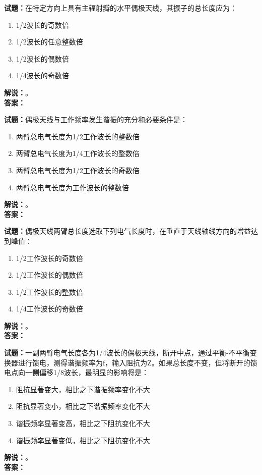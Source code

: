 \documentclass{ctexbook}
\begin{document}
\bigskip




\noindent\textbf{试题：}在特定方向上具有主辐射瓣的水平偶极天线，其振子的总长度应为：
\begin{enumerate}[leftmargin=3em]
\item 1/2波长的奇数倍
\item 1/2波长的任意整数倍
\item 1/2波长的偶数倍
\item 1/4波长的奇数倍
\end{enumerate}
\noindent\textbf{解说：}\textbf{}。\\\noindent\textbf{答案：}

\bigskip




\noindent\textbf{试题：}偶极天线与工作频率发生谐振的充分和必要条件是：
\begin{enumerate}[leftmargin=3em]
\item 两臂总电气长度为1/2工作波长的整数倍
\item 两臂总电气长度为1/4工作波长的整数倍
\item 两臂总电气长度为1/2工作波长的奇数倍
\item 两臂总电气长度为工作波长的整数倍
\end{enumerate}
\noindent\textbf{解说：}\textbf{}。\\\noindent\textbf{答案：}

\bigskip




\noindent\textbf{试题：}偶极天线两臂总长度选取下列电气长度时，在垂直于天线轴线方向的增益达到峰值：
\begin{enumerate}[leftmargin=3em]
\item 1/2工作波长的奇数倍
\item 1/2工作波长的偶数倍
\item 1/2工作波长的整数倍
\item 1/4工作波长的奇数倍
\end{enumerate}
\noindent\textbf{解说：}\textbf{}。\\\noindent\textbf{答案：}

\bigskip




\noindent\textbf{试题：}一副两臂电气长度各为1/4波长的偶极天线，断开中点，通过平衡-不平衡变换器进行馈电，测得谐振频率为f，输入阻抗为Z。如果总长度不变，但将断开的馈电点向一侧偏移1/8波长，最明显的影响将是：
\begin{enumerate}[leftmargin=3em]
\item 阻抗显著变大，相比之下谐振频率变化不大
\item 阻抗显著变小，相比之下谐振频率变化不大
\item 谐振频率显著变高，相比之下阻抗变化不大
\item 谐振频率显著变低，相比之下阻抗变化不大
\end{enumerate}
\noindent\textbf{解说：}\textbf{}。\\\noindent\textbf{答案：}
\end{document}
